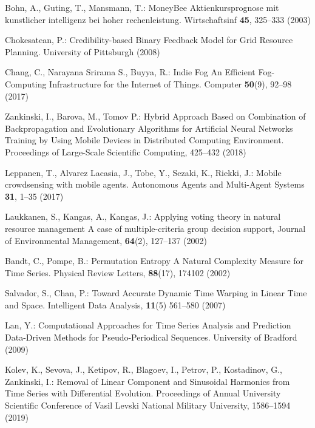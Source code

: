 \documentclass[runningheads]{llncs}
\begin{document}
\begin{thebibliography}{8}

 Bohn, A., Guting, T., Mansmann, T.: MoneyBee Aktienkursprognose mit kunstlicher intelligenz bei hoher rechenleistung. Wirtschaftsinf \textbf{45}, 325--333 (2003)

 Chokesatean, P.: Credibility-based Binary Feedback Model for Grid Resource Planning. University of Pittsburgh (2008)

 Chang, C., Narayana Srirama S., Buyya, R.: Indie Fog An Efficient Fog-Computing Infrastructure for the Internet of Things. Computer \textbf{50}(9), 92--98 (2017)

 Zankinski, I., Barova, M., Tomov P.: Hybrid Approach Based on Combination of Backpropagation and Evolutionary Algorithms for Artificial Neural Networks Training by Using Mobile Devices in Distributed Computing Environment. Proceedings of Large-Scale Scientific Computing, 425--432 (2018)

 Leppanen, T., Alvarez Lacasia, J., Tobe, Y., Sezaki, K., Riekki, J.: Mobile crowdsensing with mobile agents. Autonomous Agents and Multi-Agent Systems \textbf{31}, 1--35 (2017)

 Laukkanen, S., Kangas, A., Kangas, J.: Applying voting theory in natural resource management A case of multiple-criteria group decision support, Journal of Environmental Management, \textbf{64}(2), 127--137 (2002)

 Bandt, C., Pompe, B.: Permutation Entropy A Natural Complexity Measure for Time Series. Physical Review Letters, \textbf{88}(17), 174102 (2002)

 Salvador, S., Chan, P.: Toward Accurate Dynamic Time Warping in Linear Time and Space. Intelligent Data Analysis, \textbf{11}(5) 561--580 (2007)

 Lan, Y.: Computational Approaches for Time Series Analysis and Prediction Data-Driven Methods for Pseudo-Periodical Sequences. University of Bradford (2009)

 Kolev, K., Sevova, J., Ketipov, R., Blagoev, I., Petrov, P., Kostadinov, G., Zankinski, I.: Removal of Linear Component and Sinusoidal Harmonics from Time Series with Differential Evolution. Proceedings of Annual University Scientific Conference of Vasil Levski National Military University, 1586--1594 (2019)

\end{thebibliography}
\end{document}
